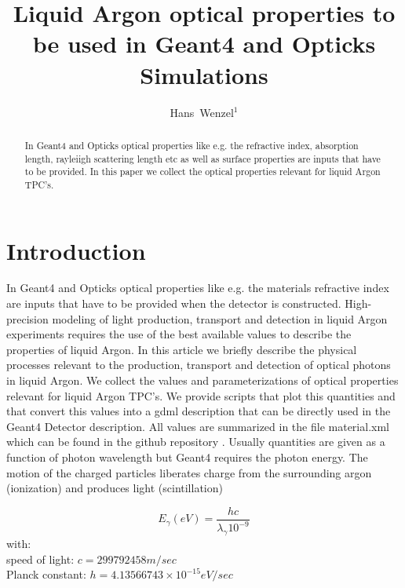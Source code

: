 \documentclass[a4paper]{jpconf}
\begin{document}
\title{Liquid Argon optical properties to be used in Geant4 and Opticks Simulations}

\author{ Hans~Wenzel$^1$}

\address{ $^1$~Fermilab PO Box 500, Batavia, IL 60510,
USA}


\begin{abstract}
  In Geant4 and Opticks optical properties like e.g. the refractive
  index, absorption length, rayleiigh scattering length etc as well as surface properties are inputs that have to be provided.
  In this paper we collect the
  optical properties relevant for liquid Argon TPC's.   
\end{abstract}
\section{Introduction}
  In Geant4 and Opticks optical properties like e.g. the materials refractive
  index are inputs that have to be provided when the detector is constructed.  High-precision modeling of 
  light production, transport and detection in liquid Argon  experiments requires the use of the best available values to describe the properties of liquid Argon.
In this article we briefly
  describe the physical processes relevant to the production, transport and detection of optical photons in liquid Argon.
  We collect the
  values and parameterizations of optical properties relevant for liquid Argon TPC's. We provide scripts that plot this quantities and that convert this values
  into a gdml description that can be directly used in the Geant4 Detector description.
  All values are summarized in the file material.xml which can be found in the github repository \cite{ref:scripts}.
  Usually quantities are given as a function of photon wavelength but Geant4 requires the photon energy.
  The motion of the charged particles liberates
charge from the surrounding argon (ionization) and
produces light (scintillation)



\begin{equation}
  E_{\gamma}(eV) = \frac{h  c}{\lambda_{\gamma}  10^{-9}}
  \label{equ:equation1}
\end{equation}
\noindent
    with:\\
  speed of light: $c = 299792458 m/sec$\\
  Planck constant: $h = 4.13566743\times10^{-15} eV/sec$\\
  \clearpage
\end{document}
